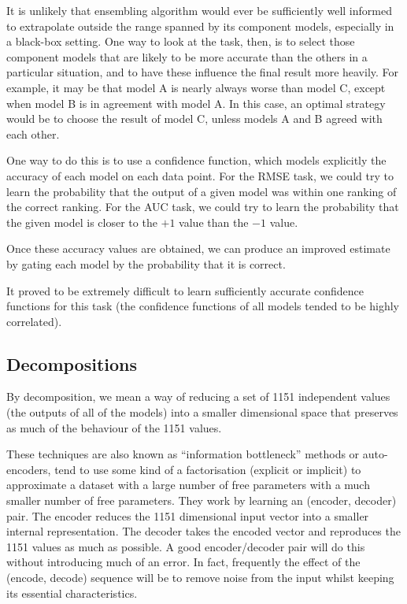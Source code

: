\documentclass{article}
\begin{document}
It is unlikely that ensembling algorithm would ever be sufficiently well informed to extrapolate outside the range spanned by its component models, especially in a black-box setting.
One way to look at the task, then, is to select those component models that are likely to be more accurate than the others in a particular situation, and to have these influence the final result more heavily.
For example, it may be that model A is nearly always worse than model C, except when model B is in agreement with model A.  In this case, an optimal strategy would be to choose the result of model C, unless models A and B agreed with each other.

One way to do this is to use a confidence function, which models explicitly the accuracy of each model on each data point.
For the RMSE task, we could try to learn the probability that the output of a given model was within one ranking of the correct ranking.  
For the AUC task, we could try to learn the probability that the given model is closer to the $+1$ value than the $-1$ value.

Once these accuracy values are obtained, we can produce an improved estimate by gating each model by the probability that it is correct.

It proved to be extremely difficult to learn sufficiently accurate confidence functions for this task (the confidence functions of all models tended to be highly correlated).

\subsection{Decompositions}

By decomposition, we mean a way of reducing a set of 1151 independent values (the outputs of all of the models) into a smaller dimensional space that preserves as much of the behaviour of the 1151 values.

These techniques are also known as ``information bottleneck'' methods or auto-encoders, tend to use some kind of a factorisation (explicit or implicit) to approximate a dataset with a large number of free parameters with a much smaller number of free parameters.
They work by learning an (encoder, decoder) pair.  The encoder reduces the 1151 dimensional input vector into a smaller internal representation.  The decoder takes the encoded vector and reproduces the 1151 values as much as possible.  A good encoder/decoder pair will do this without introducing much of an error.  In fact, frequently the effect of the (encode, decode) sequence will be to remove noise from the input whilst keeping its essential characteristics.
\end{document}

